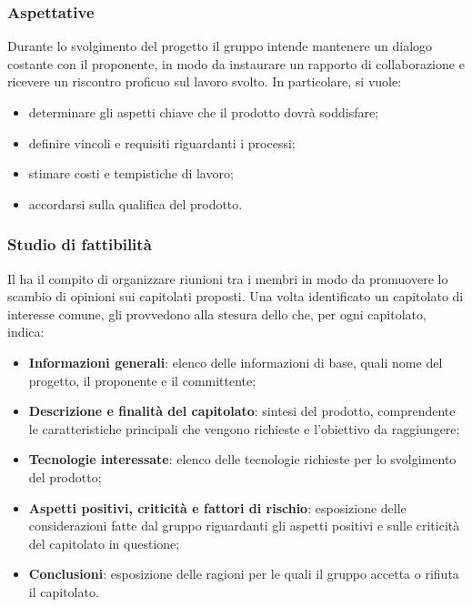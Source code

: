 \subsubsection{Aspettative}
Durante lo svolgimento del progetto il gruppo intende mantenere un dialogo costante con il proponente, in modo da instaurare un rapporto di collaborazione e ricevere un riscontro proficuo sul lavoro svolto.  In particolare, si vuole:
\begin{itemize}
	\item determinare gli aspetti chiave che il prodotto dovrà soddisfare;
	\item definire vincoli e requisiti riguardanti i processi;
	\item stimare costi e tempistiche di lavoro;
	\item accordarsi sulla qualifica del prodotto.
\end{itemize}
\subsubsection{Studio di fattibilità}
Il \RdP{} ha il compito di organizzare riunioni tra i membri in modo da promuovere lo scambio di opinioni sui capitolati proposti. Una volta identificato un capitolato di interesse comune, gli \anas{} provvedono alla stesura dello \SdF{} che, per ogni capitolato, indica:
\begin{itemize}
	\item \textbf{Informazioni generali}: elenco delle informazioni di base, quali nome del progetto, il proponente e il committente;
	\item \textbf{Descrizione e finalità del capitolato}: sintesi del prodotto, comprendente le caratteristiche principali che vengono richieste e l'obiettivo da raggiungere;
	\item \textbf{Tecnologie interessate}: elenco delle tecnologie richieste per lo svolgimento del prodotto;
	\item \textbf{Aspetti positivi, criticità e fattori di rischio}: esposizione delle considerazioni fatte dal gruppo riguardanti gli aspetti positivi e sulle criticità del capitolato in questione;
	\item \textbf{Conclusioni}: esposizione delle ragioni per le quali il gruppo accetta o rifiuta il capitolato.
\end{itemize}

